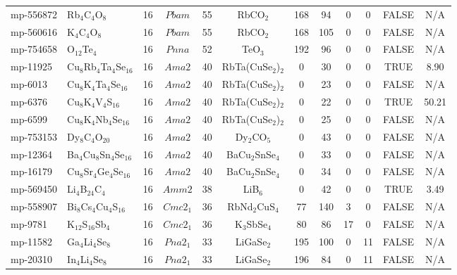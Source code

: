 {\begin{longtable}{llcccccccccc}
    mp-556872 & Rb$_{4}$C$_{4}$O$_{8}$ & 16    & $Pbam$ & 55    & RbCO$_{2}$ & 168   & 94    & 0     & 0     & FALSE & N/A \\
    mp-560616 & K$_{4}$C$_{4}$O$_{8}$ & 16    & $Pbam$ & 55    & RbCO$_{2}$ & 168   & 105   & 0     & 0     & FALSE & N/A \\
    mp-754658 & O$_{12}$Te$_{4}$ & 16    & $Pnna$ & 52    & TeO$_{3}$ & 192   & 96    & 0     & 0     & FALSE & N/A \\
    mp-11925 & Cu$_{8}$Rb$_{4}$Ta$_{4}$Se$_{16}$ & 16    & $Ama2$ & 40    & RbTa(CuSe$_{2}$)$_{2}$ & 0     & 30    & 0     & 0     & TRUE  & 8.90  \\
    mp-6013 & Cu$_{8}$K$_{4}$Ta$_{4}$Se$_{16}$ & 16    & $Ama2$ & 40    & RbTa(CuSe$_{2}$)$_{2}$ & 0     & 23    & 0     & 0     & FALSE & N/A \\
    mp-6376 & Cu$_{8}$K$_{4}$V$_{4}$S$_{16}$ & 16    & $Ama2$ & 40    & RbTa(CuSe$_{2}$)$_{2}$ & 0     & 22    & 0     & 0     & TRUE  & 50.21  \\
    mp-6599 & Cu$_{8}$K$_{4}$Nb$_{4}$Se$_{16}$ & 16    & $Ama2$ & 40    & RbTa(CuSe$_{2}$)$_{2}$ & 0     & 25    & 0     & 0     & FALSE & N/A \\
    mp-753153 & Dy$_{8}$C$_{4}$O$_{20}$ & 16    & $Ama2$ & 40    & Dy$_{2}$CO$_{5}$ & 0     & 43    & 0     & 0     & FALSE & N/A \\
    mp-12364 & Ba$_{4}$Cu$_{8}$Sn$_{4}$Se$_{16}$ & 16    & $Ama2$ & 40    & BaCu$_{2}$SnSe$_{4}$ & 0     & 33    & 0     & 0     & FALSE & N/A \\
    mp-16179 & Cu$_{8}$Sr$_{4}$Ge$_{4}$Se$_{16}$ & 16    & $Ama2$ & 40    & BaCu$_{2}$SnSe$_{4}$ & 0     & 34    & 0     & 0     & FALSE & N/A \\
    mp-569450 & Li$_{4}$B$_{24}$C$_{4}$ & 16    & $Amm2$ & 38    & LiB$_{6}$ & 0     & 42    & 0     & 0     & TRUE  & 3.49  \\
    mp-558907 & Bi$_{8}$Cs$_{4}$Cu$_{4}$S$_{16}$ & 16    & $Cmc2_1$ & 36    & RbNd$_{2}$CuS$_{4}$ & 77    & 140   & 3     & 0     & FALSE & N/A \\
    mp-9781 & K$_{12}$S$_{16}$Sb$_{4}$ & 16    & $Cmc2_1$ & 36    & K$_{3}$SbSe$_{4}$ & 80    & 86    & 17    & 0     & FALSE & N/A \\
    mp-11582 & Ga$_{4}$Li$_{4}$Se$_{8}$ & 16    & $Pna2_1$ & 33    & LiGaSe$_{2}$ & 195   & 100   & 0     & 11    & FALSE & N/A \\
    mp-20310 & In$_{4}$Li$_{4}$Se$_{8}$ & 16    & $Pna2_1$ & 33    & LiGaSe$_{2}$ & 196   & 84    & 0     & 11    & FALSE & N/A \\

\end{longtable}}
